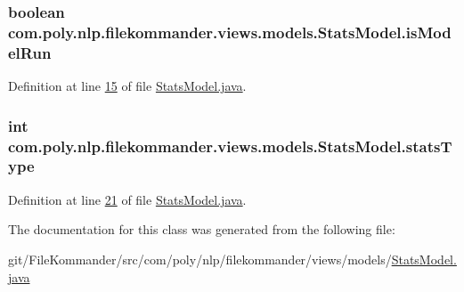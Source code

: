 \hypertarget{classcom_1_1poly_1_1nlp_1_1filekommander_1_1views_1_1models_1_1_stats_model_a3ac8d8b82975c5631fc65f47121cbfe7}{
\subsubsection[{is\-Model\-Run}]{\setlength{\rightskip}{0pt plus 5cm}boolean com.\-poly.\-nlp.\-filekommander.\-views.\-models.\-Stats\-Model.\-is\-Model\-Run\hspace{0.3cm}{\ttfamily [private]}}}\label{classcom_1_1poly_1_1nlp_1_1filekommander_1_1views_1_1models_1_1_stats_model_a3ac8d8b82975c5631fc65f47121cbfe7}


Definition at line \hyperlink{L15}{15} of file \hyperlink{}{Stats\-Model.\-java}.

\hypertarget{classcom_1_1poly_1_1nlp_1_1filekommander_1_1views_1_1models_1_1_stats_model_aa8aff56dba5f42c2f1f1b0452a461d0a}{
\subsubsection[{stats\-Type}]{\setlength{\rightskip}{0pt plus 5cm}int com.\-poly.\-nlp.\-filekommander.\-views.\-models.\-Stats\-Model.\-stats\-Type\hspace{0.3cm}{\ttfamily [private]}}}\label{classcom_1_1poly_1_1nlp_1_1filekommander_1_1views_1_1models_1_1_stats_model_aa8aff56dba5f42c2f1f1b0452a461d0a}


Definition at line \hyperlink{L21}{21} of file \hyperlink{}{Stats\-Model.\-java}.



The documentation for this class was generated from the following file\-:\begin{DoxyCompactItemize}
\item 
git/\-File\-Kommander/src/com/poly/nlp/filekommander/views/models/\hyperlink{_stats_model_8java}{Stats\-Model.\-java}\end{DoxyCompactItemize}
